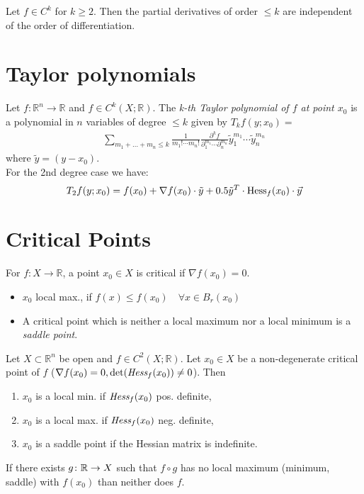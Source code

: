  Let $f \in C^k$ for $k\geq 2$. Then the partial derivatives of order $\leq k$ are independent of the order of differentiation.


\section{Taylor polynomials}

 Let $f\colon \mathbb{R}^n \to \mathbb{R}$ and $f\in C^k(X;\mathbb{R})$. The \textit{k-th Taylor polynomial of $f$ at point $x_0$} is a polynomial in $n$ variables of degree $\le k$ given by $T_kf(y;x_0) =$
\begin{align*}
\sum_{{m_1 + \ldots + m_n \leq k}}\frac{1}{m_1!\cdots m_n!}\frac{\partial^k f}{\partial_{1}^{m_1}\cdots \partial_{n}^{m_n}} \tilde y_1^{m_1}\cdots \tilde y_n^{m_n}
\end{align*}
where $\tilde y = (y-x_0)$. \\For the 2nd degree case we have:
$$T_2f(y;x_0) = f(x_0) + \nabla f (x_0) \cdot \tilde y + 0.5\tilde y^T \cdot \text{Hess}_f(x_0) \cdot \vec{y} $$


\section{Critical Points} 

 For $f\colon X\to \mathbb{R}$, a point $x_0\in X$ is critical if $\nabla f(x_0) = 0$. 
\begin{itemize}
	\item $x_0$ local max., if $f(x) \le f(x_0) \quad \forall x\in B_r(x_0)$
	\item A critical point which is neither a local maximum nor a local minimum is a \textit{saddle point}.
\end{itemize}

Let $X\subset\mathbb{R}^n$ be open and $f\in C^2(X ;\mathbb{R})$. Let $x_0 \in X$ be a non-degenerate critical point of $f$ ($\nabla f(x_0) = 0, \det(\emph{Hess}_f(x_0))\neq 0$). Then 
\begin{enumerate}
    \item $x_0$ is a local min. if $\emph{Hess}_f(x_0)$ pos. definite,
    
    \item $x_0$ is a local max. if $\emph{Hess}_f(x_0)$ neg. definite,
    
    \item $x_0$ is a saddle point if the Hessian matrix is indefinite.
\end{enumerate}

If there exists $g\colon \mathbb{R} \to X$ such that $f \circ g$ has no local maximum (minimum, saddle) with $f(x_0)$ than neither does $f$.



